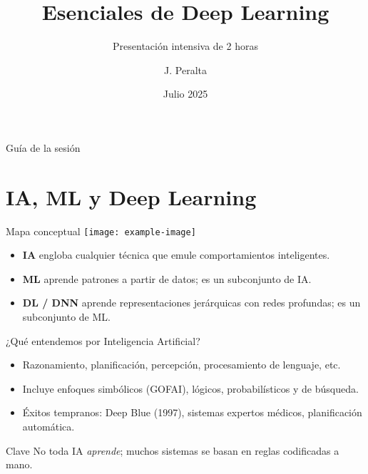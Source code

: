 \documentclass[12pt,spanish]{beamer}
\title{\textbf{Esenciales de Deep Learning}}
\subtitle{Presentación intensiva de 2 horas}
\author{J. Peralta}
\institute{Universidad Andrés Bello}
\date{Julio 2025}
\begin{document}
\begin{frame}
  \titlepage
\end{frame}

\begin{frame}{Guía de la sesión}
  \tableofcontents
\end{frame}




\section{IA, ML y Deep Learning}
\begin{frame}{Mapa conceptual}
  \centering
  \texttt{[image: example-image]}
  \vspace{.5em}

  \begin{itemize}
    \item \textbf{IA} engloba cualquier técnica que emule comportamientos inteligentes.
    \item \textbf{ML} aprende patrones a partir de datos; es un subconjunto de IA.
    \item \textbf{DL / DNN} aprende representaciones jerárquicas con redes profundas;
      es un subconjunto de ML.
  \end{itemize}
\end{frame}

\begin{frame}{¿Qué entendemos por Inteligencia Artificial?}
  \begin{itemize}
    \item Razonamiento, planificación, percepción, procesamiento de lenguaje, etc.
    \item Incluye enfoques simbólicos (GOFAI), lógicos, probabilísticos y de búsqueda.
    \item Éxitos tempranos: Deep Blue (1997), sistemas expertos médicos, planificación automática.
  \end{itemize}
  \begin{block}{Clave}
    No toda IA \emph{aprende}; muchos sistemas se basan en reglas codificadas a mano.
  \end{block}
\end{frame}
\end{document}
